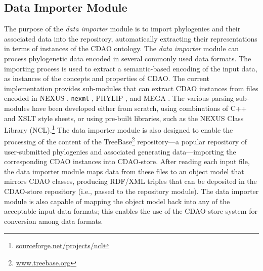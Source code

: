 \documentclass[10pt]{bmc_article}
\newenvironment{bmcformat}{\fussy\setboolean{publ}{true}}{\fussy}
\begin{document}
\begin{bmcformat}
\subsection*{Data Importer Module}
The purpose of the \emph{data importer} module is to import phylogenies and
their associated data into the repository, automatically extracting their representations
in terms of instances of the CDAO ontology.
The \emph{data importer} module can process phylogenetic data encoded in several 
commonly 
used data formats. The importing process is used to extract a semantic-based encoding
of the input data, as instances of the concepts and properties of CDAO. The current 
implementation provides sub-modules that can extract CDAO instances from files 
encoded in NEXUS \cite{nexus}, {\tt nexml} \cite{nexml}, PHYLIP \cite{phylip}, and
MEGA \cite{mega}.
The various parsing sub-modules have been developed either from scratch, using
combinations of C++ and XSLT style sheets, or using pre-built libraries, such as
the NEXUS Class Library (NCL).\footnote{\url{sourceforge.net/projects/ncl}}
The data importer module is also designed to enable the processing of the 
content of the TreeBase\footnote{\url{www.treebase.org}} repository---a popular repository of user-submitted phylogenies
and associated generating data---importing the corresponding CDAO instances
into CDAO-store.
After reading each input file, 
the data importer module maps data from these files to an object model that mirrors 
CDAO classes, producing RDF/XML triples that can be deposited in the CDAO-store
repository (i.e., passed to the repository module). The data importer module is also capable
of mapping the object model back into any of the acceptable input data formats; this enables
the use of the CDAO-store system for conversion among data formats.


\end{bmcformat}
\end{document}
